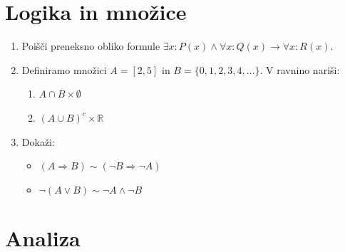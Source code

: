 \documentclass[a4paper,12pt]{article}
\begin{document}

\section*{Logika in množice}

\begin{enumerate}
\item
Poišči preneksno obliko formule \(\exists x : P(x) \land \forall x : Q(x) \to \forall x : R(x)\).

\item
Definiramo množici \(A = [2,5]\) in \(B = \{0,1,2,3,4,\ldots\}\).
V ravnino nariši:
\begin{enumerate}
\item \(A \cap B \times \emptyset\)
\item \((A \cup B)^c \times \mathbb{R}\)
\end{enumerate}

\item
Dokaži:
\begin{itemize}
\item \((A \Rightarrow B) \sim (\neg B \Rightarrow \neg A)\)
\item \(\neg(A \lor B) \sim \neg A \land \neg B\)
\end{itemize}
\end{enumerate}

\section*{Analiza}
\end{document}
